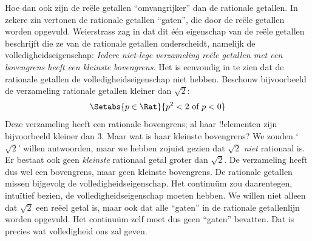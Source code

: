 \documentclass[openany]{memoir}
\begin{document}
Hoe dan ook zijn de reële getallen ``omvangrijker'' dan de rationale
getallen. In zekere zin vertonen de rationale getallen ``gaten'', die
door de reële getallen worden opgevuld. Weierstrass zag in dat dit één
eigenschap van de reële getallen beschrijft die ze van de rationale
getallen onderscheidt, namelijk de volledigheidseigenschap:
\emph{Iedere niet-lege verzameling reële getallen met een bovengrens
heeft een kleinste bovengrens.}
Het is eenvoudig in te zien dat de rationale getallen de
volledigheidseigenschap niet hebben. Beschouw bijvoorbeeld de
verzameling rationale getallen kleiner dan $\sqrt{2}$:
\[
	\Setabs{p \in \Rat}{p^2 < 2 \text{ of }p < 0}
\]
Deze verzameling heeft een rationale bovengrens; al haar !!{element}en
zijn bijvoorbeeld kleiner dan $3$. Maar wat is haar kleinste
bovengrens? We zouden `$\sqrt{2}$' willen antwoorden, maar we hebben
zojuist gezien dat $\sqrt{2}$ \emph{niet} rationaal is. Er bestaat ook
geen \emph{kleinste} rationaal getal groter dan $\sqrt{2}$. De
verzameling heeft dus wel een bovengrens, maar geen kleinste
bovengrens. De rationale getallen missen bijgevolg de
volledigheidseigenschap.
Het continuüm zou daarentegen, intuïtief bezien, de
volledigheidseigenschap moeten hebben. We willen niet alleen dat
$\sqrt{2}$ een reëel getal is, maar ook dat alle ``gaten'' in de
rationale getallenlijn worden opgevuld. Het continuüm zelf moet dus
geen ``gaten'' bevatten. Dat is precies wat volledigheid ons zal geven.
\endgroup

\begingroup
\def\olfilename{OLP-0045}
\def\olfilepath{content/sets-functions-relations/arithmetization/}
\hypertarget{unit-OLP-0045}{}
%
\end{document}
